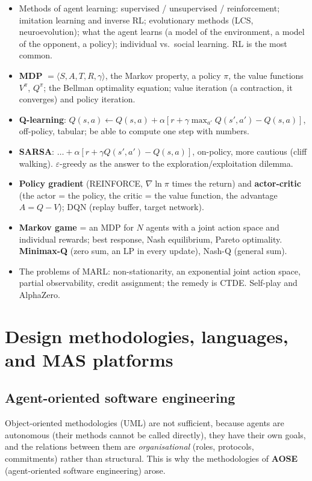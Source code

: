 \documentclass[11pt,a4paper]{article}
\theoremstyle{definition}
\begin{document}
\begin{itemize}
\item Methods of agent learning: supervised / unsupervised / reinforcement; imitation learning
  and inverse RL; evolutionary methods (LCS, neuroevolution); what the agent learns (a model of
  the environment, a model of the opponent, a policy); individual vs.\ social learning. RL is
  the most common.
\item \textbf{MDP} $= \langle S,A,T,R,\gamma\rangle$, the Markov property, a policy $\pi$, the
  value functions $V^\pi$, $Q^\pi$; the Bellman optimality equation; value iteration (a
  contraction, it converges) and policy iteration.
\item \textbf{Q-learning}:
  $Q(s,a) \leftarrow Q(s,a) + \alpha[r + \gamma\max_{a'}Q(s',a') - Q(s,a)]$,
  off-policy, tabular; be able to compute one step with numbers.
\item \textbf{SARSA}: $\dots + \alpha[r + \gamma Q(s',a') - Q(s,a)]$, on-policy, more cautious
  (cliff walking). $\varepsilon$-greedy as the answer to the exploration/exploitation dilemma.
\item \textbf{Policy gradient} (REINFORCE, $\nabla \ln \pi$ times the return) and
  \textbf{actor-critic} (the actor = the policy, the critic = the value function, the advantage
  $A = Q - V$); DQN (replay buffer, target network).
\item \textbf{Markov game} = an MDP for $N$ agents with a joint action space and individual
  rewards; best response, Nash equilibrium, Pareto optimality.
  \textbf{Minimax-Q} (zero sum, an LP in every update), Nash-Q (general sum).
\item The problems of MARL: non-stationarity, an exponential joint action space, partial
  observability, credit assignment; the remedy is CTDE. Self-play and AlphaZero.
\end{itemize}

\section{Design methodologies, languages, and MAS platforms}
\label{sec:metodologie}

\subsection{Agent-oriented software engineering}
Object-oriented methodologies (UML) are not sufficient, because agents are autonomous (their methods
cannot be called directly), they have their own goals, and the relations between them are
\emph{organisational} (roles, protocols, commitments) rather than structural. This is why the
methodologies of \textbf{AOSE} (agent-oriented software engineering) arose.
\end{document}
